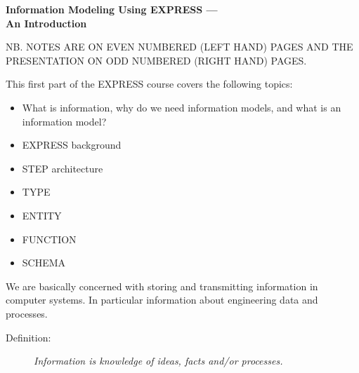 %
%
%

\pagestyle{empty}
\bodsiz

\vspace*{\beftit}
\begin{center}
{\titsiz \bfseries Information Modeling Using EXPRESS --- \\ An Introduction }
\end{center}
\vspace{\beftit}
\vspace{\beftit}
\begin{center}
\end{center}

\clearpage

\ifnotes
  \pagestyle{plain}
\else
  \pagestyle{empty}
\fi


\begin{remarks}
\remintro
NB. NOTES ARE ON EVEN NUMBERED (LEFT HAND) PAGES AND THE PRESENTATION ON
ODD NUMBERED (RIGHT HAND) PAGES.



    This first part of the EXPRESS course covers the following topics:
\begin{itemize}
\item What is information, why do we need information models, and
      what is an information model?
\item EXPRESS background
\item STEP architecture
\item TYPE
\item ENTITY
\item FUNCTION
\item SCHEMA
\end{itemize}

    We are basically concerned with storing and transmitting information
in computer systems. In particular information about engineering
data and processes. 

\remend
\end{remarks}


\begin{description}
\item[Definition:] \emph{Information is knowledge of ideas, facts and/or 
                        processes.}
\end{description}

